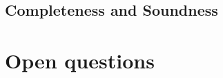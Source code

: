 \documentclass[../thesis-main/thesis-main]{subfiles}
\begin{document}
\begin{comment}
(FROM THE OLD PROOF)

\begin{lemma}
Let $h$ be the $\left(n+1\right)\times(n+1)$ matrix defined as 
\[
h=\begin{pmatrix}
na^{2} & ab & ac & ac & \ldots & ac\\
ab & b^{2} & 0 & 0 & \ldots & 0\\
ac & 0 & c^{2} & 0 & \ldots & 0\\
ac & 0 & 0 & c^{2} & \ldots & 0\\
\vdots & \vdots & \vdots & \vdots & \ddots & \vdots\\
ac & 0 & 0 & 0 & \ldots & c^{2}
\end{pmatrix}
\]
with $c>b>a>0$ and basis states labeled $|0\rangle,\ldots,|n\rangle$ from left to right and top to bottom. Then $h\geq0$, the unique eigenvector with eigenvalue zero is
\[
|\phi\rangle=\frac{1}{\sqrt{a^{2}+b^{2}+\left(n-1\right)c^{2}}}\left(a|0\rangle-b|1\rangle-c\sum_{j=2}^{n}|j\rangle\right),
\]
and the smallest nonzero eigenvalue satisfies $\gamma(h)\geq b^{2}-ab$.
\end{lemma}

\begin{proof}
First change basis to 
\[
\{|0\rangle,|1\rangle,|\alpha_{0}\rangle,|\alpha_{1}\rangle,\ldots,|\alpha_{n-2}\rangle\}
\]
where $|\alpha_{k}\rangle=\left(\sqrt{n-1}\right)^{-1}\sum_{j=2}^{n}e^{\frac{2\pi ijk}{n-1}}|j\rangle$.
In this basis $h$ is given by
\[
\begin{pmatrix}
na^{2} & ab & ac\sqrt{n-1} & 0 & \ldots & 0\\
ab & b^{2} & 0 & 0 & \ldots & 0\\
ac\sqrt{n-1} & 0 & c^{2} & 0 & \ldots & 0\\
0 & 0 & 0 & c^{2} & \ldots & 0\\
\vdots & \vdots & \vdots & \vdots & \ddots & \vdots\\
0 & 0 & 0 & 0 & \ldots & c^{2}
\end{pmatrix}
\]
 and its eigenvalues are $c^{2}$ (with multiplicity $n-1$) along
with the eigenvalues of the top left $3\times3$ submatrix, which
are 
\[
\left\{ 0,\frac{1}{2}\left(b^{2}+c^{2}+a^{2}n\pm\sqrt{\left(c^{2}-b^{2}+a^{2}n\right)^{2}+4a^{2}b^{2}-4a^{2}c^{2}}\right)\right\} .
\]
 One can easily confirm that the zero eigenvector is $|\phi\rangle$
as given in the statement of the Lemma. Using the inequality $\sqrt{\left(c^{2}-b^{2}+a^{2}n\right)^{2}+4a^{2}b^{2}-4a^{2}c^{2}}\leq\left(c^{2}-b^{2}+a^{2}n\right)+2ab$
gives 
\[
\frac{1}{2}\left(b^{2}+c^{2}+a^{2}n-\sqrt{\left(c^{2}-b^{2}+a^{2}n\right)^{2}+4a^{2}b^{2}-4a^{2}c^{2}}\right)\geq\frac{1}{2}\left(2b^{2}-2ab\right)=b^{2}-ab.
\]
From this (and the fact that $c^{2}\geq b^{2}-ab\geq0$) we see that $h\geq0$ and we get the bound $\gamma(h)\geq b^{2}-ab$, which completes the proof.
\end{proof}
\end{comment}




\subsection{Completeness and Soundness}

\section{Open questions}
\end{document}
